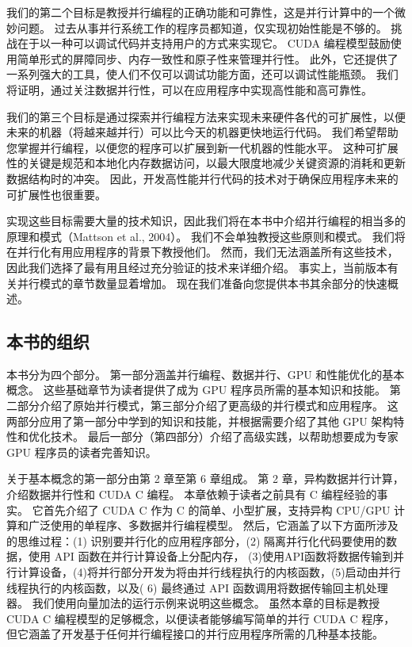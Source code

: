 我们的第二个目标是教授并行编程的正确功能和可靠性，这是并行计算中的一个微妙问题。 过去从事并行系统工作的程序员都知道，仅实现初始性能是不够的。 挑战在于以一种可以调试代码并支持用户的方式来实现它。 CUDA 编程模型鼓励使用简单形式的屏障同步、内存一致性和原子性来管理并行性。 此外，它还提供了一系列强大的工具，使人们不仅可以调试功能方面，还可以调试性能瓶颈。 我们将证明，通过关注数据并行性，可以在应用程序中实现高性能和高可靠性。

我们的第三个目标是通过探索并行编程方法来实现未来硬件各代的可扩展性，以便未来的机器（将越来越并行）可以比今天的机器更快地运行代码。 我们希望帮助您掌握并行编程，以便您的程序可以扩展到新一代机器的性能水平。 这种可扩展性的关键是规范和本地化内存数据访问，以最大限度地减少关键资源的消耗和更新数据结构时的冲突。 因此，开发高性能并行代码的技术对于确保应用程序未来的可扩展性也很重要。

实现这些目标需要大量的技术知识，因此我们将在本书中介绍并行编程的相当多的原理和模式（Mattson et al., 2004）。 我们不会单独教授这些原则和模式。 我们将在并行化有用应用程序的背景下教授他们。 然而，我们无法涵盖所有这些技术，因此我们选择了最有用且经过充分验证的技术来详细介绍。 事实上，当前版本有关并行模式的章节数量显着增加。 现在我们准备向您提供本书其余部分的快速概述。

\subsection{本书的组织}
本书分为四个部分。 第一部分涵盖并行编程、数据并行、GPU 和性能优化的基本概念。 这些基础章节为读者提供了成为 GPU 程序员所需的基本知识和技能。 第二部分介绍了原始并行模式，第三部分介绍了更高级的并行模式和应用程序。 这两部分应用了第一部分中学到的知识和技能，并根据需要介绍了其他 GPU 架构特性和优化技术。 最后一部分（第四部分）介绍了高级实践，以帮助想要成为专家 GPU 程序员的读者完善知识。

关于基本概念的第一部分由第 2 章至第 6 章组成。 第 2 章，异构数据并行计算，介绍数据并行性和 CUDA C 编程。 本章依赖于读者之前具有 C 编程经验的事实。 它首先介绍了 CUDA C 作为 C 的简单、小型扩展，支持异构 CPU/GPU 计算和广泛使用的单程序、多数据并行编程模型。 然后，它涵盖了以下方面所涉及的思维过程：(1) 识别要并行化的应用程序部分，(2) 隔离并行化代码要使用的数据，使用 API 函数在并行计算设备上分配内存， (3)使用API函数将数据传输到并行计算设备，(4)将并行部分开发为将由并行线程执行的内核函数，(5)启动由并行线程执行的内核函数，以及( 6) 最终通过 API 函数调用将数据传输回主机处理器。 我们使用向量加法的运行示例来说明这些概念。 虽然本章的目标是教授 CUDA C 编程模型的足够概念，以便读者能够编写简单的并行 CUDA C 程序，但它涵盖了开发基于任何并行编程接口的并行应用程序所需的几种基本技能。


